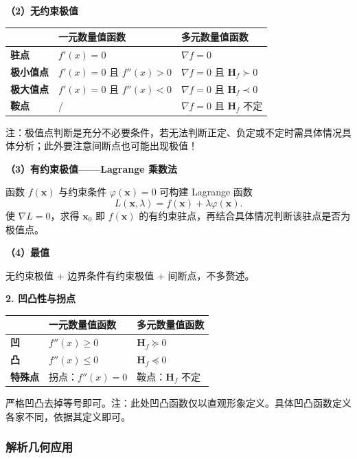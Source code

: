 \documentclass[UTF8,fontset=fandol,zihao=5]{ctexart}
\begin{document}
\textbf{（2）无约束极值}

\begin{center}
\begin{tabularx}{\textwidth}{>{\bfseries}p{2.5cm}XX}
\toprule
 & 一元数量值函数 & 多元数量值函数 \\
\midrule
驻点 & $f'(x)=0$ & $\nabla f=0$ \\
极小值点 & $f'(x)=0$ 且 $f''(x)>0$ & $\nabla f=0$ 且 $\bm H_f\succ0$ \\
极大值点 & $f'(x)=0$ 且 $f''(x)<0$ & $\nabla f=0$ 且 $\bm H_f\prec0$ \\
鞍点 & / & $\nabla f=0$ 且 $\bm H_f$ 不定 \\
\bottomrule
\end{tabularx}
\end{center}

注：极值点判断是充分不必要条件，若无法判断正定、负定或不定时需具体情况具体分析；此外要注意间断点也可能出现极值！

\textbf{（3）有约束极值——Lagrange 乘数法}

函数 $f(\bm x)$ 与约束条件 $\varphi(\bm x)=0$ 可构建 Lagrange 函数
\[
L(\bm x,\lambda)=f(\bm x)+\lambda\varphi(\bm x).
\]
使 $\nabla L=0$，求得 $\bm x_0$ 即 $f(\bm x)$ 的有约束驻点，再结合具体情况判断该驻点是否为极值点。

\textbf{（4）最值}

无约束极值 $+$ 边界条件有约束极值 $+$ 间断点，不多赘述。

\textbf{2. 凹凸性与拐点}

\begin{center}
\begin{tabularx}{\textwidth}{>{\bfseries}p{2.5cm}XX}
\toprule
 & 一元数量值函数 & 多元数量值函数 \\
\midrule
凹 & $f''(x)\geq0$ & $\bm H_f\succeq0$ \\
凸 & $f''(x)\leq0$ & $\bm H_f\preceq0$ \\
特殊点 & 拐点：$f''(x)=0$ & 鞍点：$\bm H_f$ 不定 \\
\bottomrule
\end{tabularx}
\end{center}

严格凹凸去掉等号即可。注：此处凹凸函数仅以直观形象定义。具体凹凸函数定义各家不同，依据其定义即可。

\subsubsection{解析几何应用}
\end{document}
